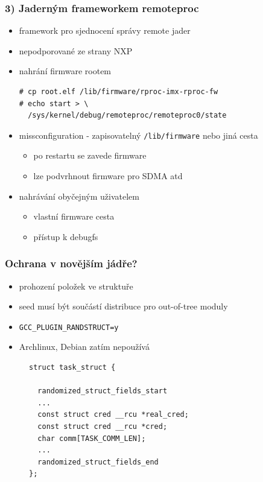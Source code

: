 \documentclass{beamer}
\begin{document}
\begin{frame}[fragile]
\frametitle{3) Jaderným frameworkem remoteproc}
\begin{itemize}
	\item framework pro sjednocení správy remote jader
	\item nepodporované ze strany NXP
	\item nahrání firmware rootem
\begin{verbatim}
# cp root.elf /lib/firmware/rproc-imx-rproc-fw
# echo start > \
  /sys/kernel/debug/remoteproc/remoteproc0/state
\end{verbatim}
	\item missconfiguration - zapisovatelný \texttt{/lib/firmware} nebo jiná cesta
	\begin{itemize}
		\item po restartu se zavede firmware
		\item lze podvrhnout firmware pro SDMA atd
	\end{itemize}

	\item nahrávání obyčejným uživatelem
	\begin{itemize}
		\item vlastní firmware cesta
		\item přístup k debugfs
	\end{itemize}
		
\end{itemize}
\end{frame}

\begin{frame}[fragile]
\frametitle{Ochrana v novějším jádře?}
\begin{itemize}
	\item prohození položek ve struktuře
	\item seed musí být součástí distribuce pro out-of-tree moduly
	\item \texttt{GCC\_PLUGIN\_RANDSTRUCT=y}
	\item Archlinux, Debian zatím nepoužívá
\end{itemize}
\begin{figure}
\begin{verbatim}
struct task_struct {
  
  randomized_struct_fields_start
  ...
  const struct cred __rcu *real_cred;
  const struct cred __rcu *cred;
  char comm[TASK_COMM_LEN];
  ...
  randomized_struct_fields_end
};
\end{verbatim}
\end{figure}
\end{frame}
\end{document}

